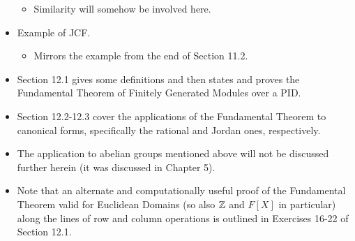 \documentclass[../notes.tex]{subfiles}
\begin{document}
\begin{itemize}
\begin{itemize}
        \item Similarity will somehow be involved here.
    \end{itemize}
    \item Example of JCF.
    \begin{itemize}
        \item Mirrors the example from the end of Section 11.2.
    \end{itemize}
    \item Section 12.1 gives some definitions and then states and proves the Fundamental Theorem of Finitely Generated Modules over a PID.
    \item Section 12.2-12.3 cover the applications of the Fundamental Theorem to canonical forms, specifically the rational and Jordan ones, respectively.
    \item The application to abelian groups mentioned above will not be discussed further herein (it was discussed in Chapter 5).
    \item Note that an alternate and computationally useful proof of the Fundamental Theorem valid for Euclidean Domains (so also $\mathbb{Z}$ and $F[X]$ in particular) along the lines of row and column operations is outlined in Exercises 16-22 of Section 12.1.
\end{itemize}
\end{document}
